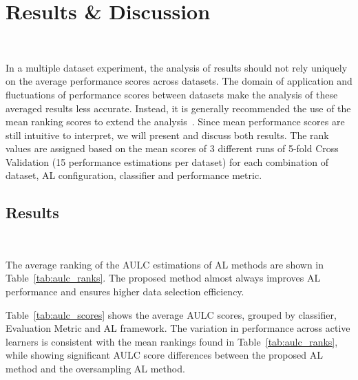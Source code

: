 \documentclass[parskip=full]{scrartcl}
\begin{document}
\section{Results \& Discussion}~\label{sec:results_discussion}

In a multiple dataset experiment, the analysis of results should not rely
uniquely on the average performance scores across datasets. The domain of
application and fluctuations of performance scores between datasets make the
analysis of these averaged results less accurate. Instead, it is generally
recommended the use of the mean ranking scores to extend the
analysis~\cite{Demsar2006}. Since mean performance scores are still intuitive
to interpret, we will present and discuss both results. The rank values are
assigned based on the mean scores of 3 different runs of 5-fold Cross
Validation (15 performance estimations per dataset) for each combination of
dataset, AL configuration, classifier and performance metric.

\subsection{Results}~\label{sec:results}

The average ranking of the AULC estimations of AL methods are shown in
Table~\ref{tab:aulc_ranks}. The proposed method almost always improves AL
performance and ensures higher data selection efficiency.

\begin{table}[H]
    \centering
    \caption{%
        Mean rankings of the AULC metric over the different datasets (10),
        folds (5) and runs (3) used in the experiment. The proposed method
        always improves the results of the original framework and on average
        almost always improves the results of the oversampling framework.
    }\label{tab:aulc_ranks}
\end{table}

Table~\ref{tab:aulc_scores} shows the average AULC scores, grouped by
classifier, Evaluation Metric and AL framework. The variation in performance
across active learners is consistent with the mean rankings found in
Table~\ref{tab:aulc_ranks}, while showing significant AULC score differences
between the proposed AL method and the oversampling AL method.
\end{document}
